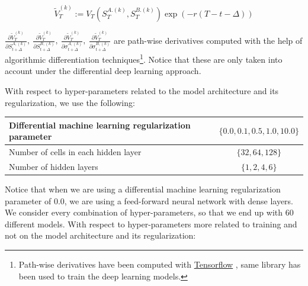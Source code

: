 $$\tilde{V}_{T}^{(k)} := V_T\left(S_T^{A.(k)}, S_T^{B.(k)}\right)\exp\left(-r\left(T-t-\Delta\right)\right)$$

$\frac{\partial \tilde{V}_{T}^{(k)}}{\partial S_{t+\Delta}^{A,(k)}},\  
\frac{\partial \tilde{V}_{T}^{(k)}}{\partial S_{t+\Delta}^{B,(k)}},\ 
\frac{\partial \tilde{V}_{T}^{(k)}}{\partial \sigma_{t+\Delta}^{A,(k)}},\ 
\frac{\partial \tilde{V}_{T}^{(k)}}{\partial \sigma_{t+\Delta}^{B,(k)}}
$ are path-wise derivatives computed with the help of algorithmic differentiation techniques\footnote{Path-wise derivatives have been computed with \href{www.Tensorflow.org}{Tensorflow} , same library has been used to train the deep learning models. }. Notice that these are only taken into account under the differential deep learning approach.

With respect to hyper-parameters related to the model architecture and its regularization, we use the following:


 

\begin{center}
\begin{tabular}{||l | c||} 
 \hline
 Differential machine learning regularization parameter & $\{0.0, 0.1, 0.5, 1.0, 10.0\}$ \\
 \hline
 Number of cells in each hidden layer  & $\{32, 64, 128\}$  \\
 \hline
 Number of hidden layers  & $\{1 ,2 ,4 ,6\}$  \\
 \hline
 \end{tabular}
\end{center}


Notice that when we are using a differential machine learning regularization parameter of 0.0, we are using a feed-forward neural network with dense layers. We consider every combination of hyper-parameters, so that we end up with $60$ different models. With respect to hyper-parameters more related to training and not on the model architecture and its regularization:


